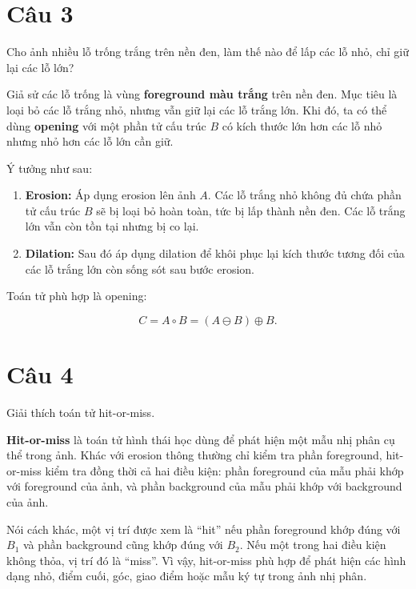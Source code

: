 \section*{Câu 3}
Cho ảnh nhiều lỗ trống trắng trên nền đen, làm thế nào để lấp các lỗ nhỏ, chỉ giữ lại các lỗ lớn?

Giả sử các lỗ trống là vùng \textbf{foreground màu trắng} trên nền đen. Mục tiêu là loại bỏ các lỗ trắng nhỏ, nhưng vẫn giữ lại các lỗ trắng lớn. Khi đó, ta có thể dùng \textbf{opening} với một phần tử cấu trúc $B$ có kích thước lớn hơn các lỗ nhỏ nhưng nhỏ hơn các lỗ lớn cần giữ.

Ý tưởng như sau:

\begin{enumerate}
    \item \textbf{Erosion:} Áp dụng erosion lên ảnh $A$. Các lỗ trắng nhỏ không đủ chứa phần tử cấu trúc $B$ sẽ bị loại bỏ hoàn toàn, tức bị lấp thành nền đen. Các lỗ trắng lớn vẫn còn tồn tại nhưng bị co lại.

    \item \textbf{Dilation:} Sau đó áp dụng dilation để khôi phục lại kích thước tương đối của các lỗ trắng lớn còn sống sót sau bước erosion.
\end{enumerate}

Toán tử phù hợp là opening:

\begin{equation}
    C = A \circ B = (A \ominus B) \oplus B.
\end{equation}

\section*{Câu 4}
Giải thích toán tử hit-or-miss.

\textbf{Hit-or-miss} là toán tử hình thái học dùng để phát hiện một mẫu nhị phân cụ thể trong ảnh. Khác với erosion thông thường chỉ kiểm tra phần foreground, hit-or-miss kiểm tra đồng thời cả hai điều kiện: phần foreground của mẫu phải khớp với foreground của ảnh, và phần background của mẫu phải khớp với background của ảnh.

Nói cách khác, một vị trí được xem là ``hit'' nếu phần foreground khớp đúng với $B_1$ và phần background cũng khớp đúng với $B_2$. Nếu một trong hai điều kiện không thỏa, vị trí đó là ``miss''. Vì vậy, hit-or-miss phù hợp để phát hiện các hình dạng nhỏ, điểm cuối, góc, giao điểm hoặc mẫu ký tự trong ảnh nhị phân.


